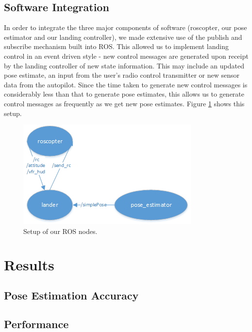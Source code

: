 \documentclass[10pt]{scrartcl} %
\begin{document}
\subsection{Software Integration}
In order to integrate the three major components of software (roscopter, our pose estimator and our landing controller), we made extensive use of the publish and subscribe mechanism built into ROS. This allowed us to implement landing control in an event driven style - new control messages are generated upon receipt by the landing controller of new state information. This may include an updated pose estimate, an input from the user's radio control transmitter or new sensor data from the autopilot. Since the time taken to generate new control messages is considerably less than that to generate pose estimates, this allows us to generate control messages as frequently as we get new pose estimates. Figure \ref{fig:rosnodes} shows this setup.

\begin{figure}[h]
    \centering
    \includegraphics{images/rosnodes.png}
    \caption{Setup of our ROS nodes.}
    \label{fig:rosnodes}
\end{figure}

\section{Results}

\subsection{Pose Estimation Accuracy}



\subsection{Performance}
\end{document}
